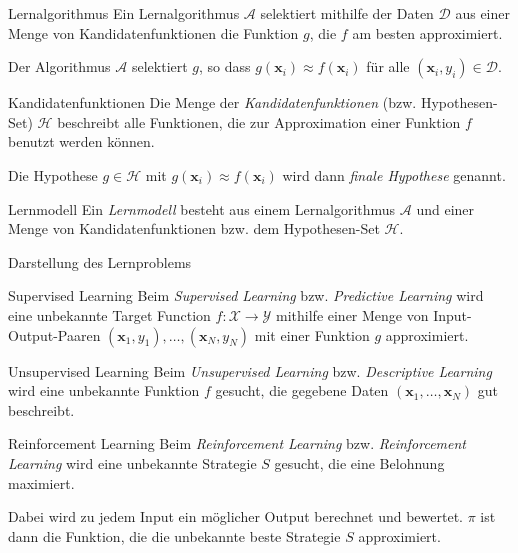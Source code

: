 \begin{defi}{Lernalgorithmus}
    Ein Lernalgorithmus $\mathcal{A}$ selektiert mithilfe der Daten $\mathcal{D}$ aus einer Menge von Kandidatenfunktionen die Funktion $g$, die $f$ am besten approximiert.

    Der Algorithmus $\mathcal{A}$ selektiert $g$, so dass $g(\mathbf{x}_i) \approx f(\mathbf{x}_i)$ für alle $(\mathbf{x}_i, y_i) \in \mathcal{D}$.
\end{defi}

\begin{defi}{Kandidatenfunktionen}
    Die Menge der \emph{Kandidatenfunktionen} (bzw. Hypothesen-Set) $\mathcal{H}$ beschreibt alle Funktionen, die zur Approximation einer Funktion $f$ benutzt werden können.

    Die Hypothese $g \in \mathcal{H}$ mit $g(\mathbf{x}_i) \approx f(\mathbf{x}_i)$ wird dann \emph{finale Hypothese} genannt.
\end{defi}

\begin{defi}{Lernmodell}
    Ein \emph{Lernmodell} besteht aus einem Lernalgorithmus $\mathcal{A}$ und einer Menge von Kandidatenfunktionen bzw. dem Hypothesen-Set $\mathcal{H}$.
\end{defi}

\begin{bonus}{Darstellung des Lernproblems}

\end{bonus}

\begin{defi}{Supervised Learning}
    Beim \emph{Supervised Learning} bzw. \emph{Predictive Learning} wird eine unbekannte Target Function $f: \mathcal{X} \to \mathcal{Y}$ mithilfe einer Menge von Input-Output-Paaren $(\mathbf{x}_1, y_1), \ldots, (\mathbf{x}_N, y_N)$ mit einer Funktion $g$ approximiert.
\end{defi}

\begin{defi}{Unsupervised Learning}
    Beim \emph{Unsupervised Learning} bzw. \emph{Descriptive Learning} wird eine unbekannte Funktion $f$ gesucht, die gegebene Daten $(\mathbf{x}_1, \ldots, \mathbf{x}_N)$ gut beschreibt.
\end{defi}

\begin{defi}{Reinforcement Learning}
    Beim \emph{Reinforcement Learning} bzw. \emph{Reinforcement Learning} wird eine unbekannte Strategie $S$ gesucht, die eine Belohnung maximiert.

    Dabei wird zu jedem Input ein möglicher Output berechnet und bewertet.
    $\pi$ ist dann die Funktion, die die unbekannte beste Strategie $S$ approximiert.
\end{defi}

